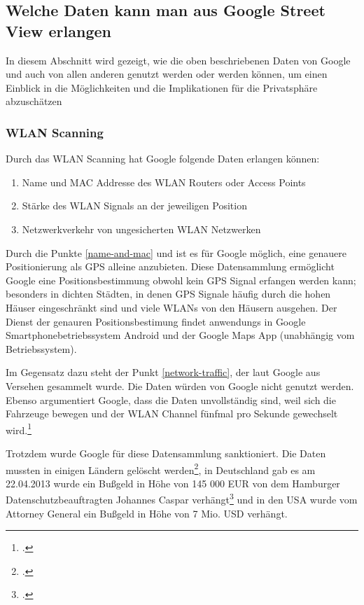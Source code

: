 \subsection{Welche Daten kann man aus Google Street View erlangen}

In diesem Abschnitt wird gezeigt, wie die oben beschriebenen Daten von Google
und auch von allen anderen genutzt werden oder werden können, um einen Einblick
in die Möglichkeiten und die Implikationen für die Privatsphäre abzuschätzen

\subsubsection{WLAN Scanning}

Durch das WLAN Scanning hat Google folgende Daten erlangen können:

\begin{enumerate}
  \item Name und MAC Addresse des WLAN Routers oder Access Points \label{name-and-mac}
  \item Stärke des WLAN Signals an der jeweiligen Position \label{signal-strength}
  \item Netzwerkverkehr von ungesicherten WLAN Netzwerken \label{network-traffic}
\end{enumerate}

Durch die Punkte \ref{name-and-mac} und \label{signal-strength} ist es für
Google möglich, eine genauere Positionierung als GPS alleine anzubieten. Diese
Datensammlung ermöglicht Google eine Positionsbestimmung obwohl kein GPS Signal
erfangen werden kann; besonders in dichten Städten, in denen GPS Signale häufig
durch die hohen Häuser eingeschränkt sind und viele WLANs von den Häusern
ausgehen. Der Dienst der genauren Positionsbestimung findet anwendungs in Google
Smartphonebetriebssystem Android und der Google Maps App (unabhängig vom
Betriebssystem).

Im Gegensatz dazu steht der Punkt \ref{network-traffic}, der laut Google aus
Versehen gesammelt wurde. Die Daten würden von Google nicht genutzt werden.
Ebenso argumentiert Google, dass die Daten unvollständig sind, weil sich die
Fahrzeuge bewegen und der WLAN Channel fünfmal pro Sekunde gewechselt wird.\footcite{website:googleblog:wifi-data-collection}

Trotzdem wurde Google für diese Datensammlung sanktioniert. Die Daten mussten in
einigen Ländern gelöscht werden\footcite{website:isec:ireland-destroy-notice}, in
Deutschland gab es am 22.04.2013 wurde ein Bußgeld in Höhe von 145 000 EUR von dem
Hamburger Datenschutzbeauftragten Johannes Caspar verhängt\footcite{website:nwzonline:google-wifi-sanction}
und in den USA wurde vom Attorney General ein Bußgeld in Höhe von 7 Mio. USD verhängt.%

